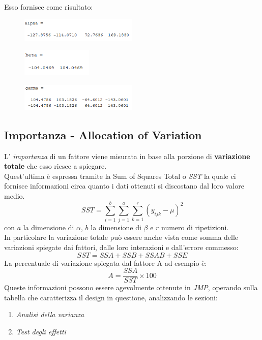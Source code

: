 Esso fornisce come risultato:
\begin{figure}[H]
	\includegraphics[width=0.5\textwidth]{img/hw4/alpha.png}
\end{figure}
\begin{figure}[H]
	\includegraphics[width=0.3\textwidth]{img/hw4/beta.png}
\end{figure}
\begin{figure}[H]
	\includegraphics[width=0.5\textwidth]{img/hw4/gamma.png}
\end{figure}

\subsection{Importanza - Allocation of Variation}
L' \textit{importanza} di un fattore viene misurata in base alla porzione di \textbf{variazione totale} che esso riesce a spiegare.
\\Quest'ultima è espressa tramite la Sum of Squares Total o \textit{SST} la quale ci fornisce informazioni circa quanto i dati ottenuti si discostano dal loro valore medio.
\begin{equation}
	SST = \sum_{i = 1}^{b}\sum_{j = 1}^{a}\sum_{k = 1}^{r}{({y_{ijk}} - \mu)^2}
\end{equation}
con $a$ la dimensione di $\alpha$, $b$ la dimensione di $\beta$ e $r$ numero di ripetizioni.
\\In particolare la variazione totale può essere anche vista come somma delle variazioni spiegate dai fattori, dalle loro interazioni e dall'errore commesso:
\begin{equation*}
	SST = SSA + SSB + SSAB + SSE
\end{equation*}
La percentuale di variazione spiegata dal fattore A ad esempio è: 
\begin{equation*}
	A = \dfrac{SSA}{SST} \times 100
\end{equation*}
Queste informazioni possono essere agevolmente ottenute in \textit{JMP}, operando sulla tabella che caratterizza il design in questione, analizzando le sezioni:
\begin{enumerate}
	\item \textit{Analisi della varianza}
	\item \textit{Test degli effetti}
\end{enumerate}
